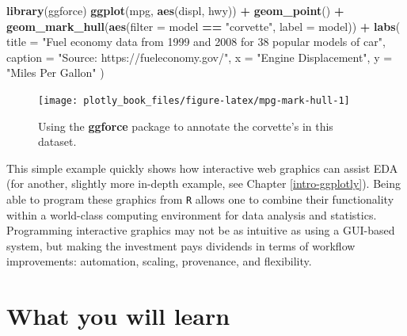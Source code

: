 \documentclass[
  12pt,
]{krantz}
\newenvironment{Shaded}{\begin{snugshade}}{\end{snugshade}}
\newcommand{\DataTypeTok}[1]{\textcolor[rgb]{0.13,0.29,0.53}{#1}}
\newcommand{\KeywordTok}[1]{\textcolor[rgb]{0.13,0.29,0.53}{\textbf{#1}}}
\newcommand{\NormalTok}[1]{#1}
\newcommand{\OperatorTok}[1]{\textcolor[rgb]{0.81,0.36,0.00}{\textbf{#1}}}
\newcommand{\StringTok}[1]{\textcolor[rgb]{0.31,0.60,0.02}{#1}}
\begin{document}
\begin{Shaded}
\begin{Highlighting}[]
\KeywordTok{library}\NormalTok{(ggforce)}
\KeywordTok{ggplot}\NormalTok{(mpg, }\KeywordTok{aes}\NormalTok{(displ, hwy)) }\OperatorTok{+}\StringTok{ }
\StringTok{  }\KeywordTok{geom_point}\NormalTok{() }\OperatorTok{+}
\StringTok{  }\KeywordTok{geom_mark_hull}\NormalTok{(}\KeywordTok{aes}\NormalTok{(}\DataTypeTok{filter =}\NormalTok{ model }\OperatorTok{==}\StringTok{ "corvette"}\NormalTok{, }\DataTypeTok{label =}\NormalTok{ model)) }\OperatorTok{+}
\StringTok{  }\KeywordTok{labs}\NormalTok{(}
    \DataTypeTok{title =} \StringTok{"Fuel economy data from 1999 and 2008 for 38 popular models of car"}\NormalTok{,}
    \DataTypeTok{caption =} \StringTok{"Source: https://fueleconomy.gov/"}\NormalTok{,}
    \DataTypeTok{x =} \StringTok{"Engine Displacement"}\NormalTok{, }
    \DataTypeTok{y =} \StringTok{"Miles Per Gallon"}
\NormalTok{  )}
\end{Highlighting}
\end{Shaded}

\begin{figure}

{\centering \texttt{[image: plotly\_book\_files/figure-latex/mpg-mark-hull-1]} 

}

\caption{Using the \textbf{ggforce} package to annotate the corvette's in this dataset.}\label{fig:mpg-mark-hull}
\end{figure}

This simple example quickly shows how interactive web graphics can assist EDA (for another, slightly more in-depth example, see Chapter \ref{intro-ggplotly}). Being able to program these graphics from \texttt{R} allows one to combine their functionality within a world-class computing environment for data analysis and statistics. Programming interactive graphics may not be as intuitive as using a GUI-based system, but making the investment pays dividends in terms of workflow improvements: automation, scaling, provenance, and flexibility.

\hypertarget{what-you-will-learn}{%
\section{What you will learn}\label{what-you-will-learn}}
\end{document}

